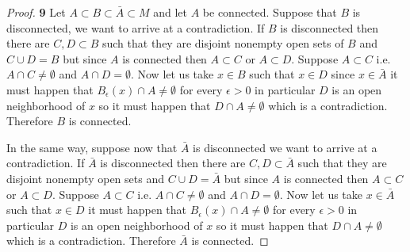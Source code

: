 \documentclass[11pt]{article}
\theoremstyle{definition}
\begin{document}
	\begin{proof}{\textbf{9}}
        Let $A \subset B \subset \bar{A} \subset M$ and let $A$ be connected.
        Suppose that $B$ is disconnected, we want to arrive at a contradiction.
        If $B$ is disconnected then there are $C,D \subset B$ such that they
        are disjoint nonempty open sets of $B$ and $C \cup D = B$ but since
        $A$ is connected then $A \subset C$ or $A \subset D$. Suppose
        $A \subset C$ i.e. $A \cap C \neq \emptyset$ and $A \cap D = \emptyset$.
        Now let us take
        $x \in B$ such that $x \in D$ since $x \in \bar{A}$ it must happen that
        $B_\epsilon(x) \cap A \neq \emptyset$ for every $\epsilon > 0$ in
        particular $D$ is an open neighborhood of $x$ so it must happen that
        $D \cap A \neq \emptyset$ which is a contradiction. Therefore $B$ is
        connected.

        In the same way, suppose now that $\bar{A}$ is disconnected we want to
        arrive at a contradiction. If $\bar{A}$ is disconnected then there are
        $C,D \subset \bar{A}$ such that they are disjoint nonempty open sets
        and $C \cup D = \bar{A}$ but since $A$ is connected then $A \subset C$
        or $A \subset D$. Suppose $A \subset C$ i.e. $A \cap C \neq \emptyset$
        and $A \cap D = \emptyset$.
        Now let us take $x \in \bar{A}$ such that $x \in D$ it must happen that
        $B_\epsilon(x) \cap A \neq \emptyset$ for every $\epsilon > 0$ in
        particular $D$ is an open neighborhood of $x$ so it must happen that
        $D \cap A \neq \emptyset$ which is a contradiction. Therefore $\bar{A}$
        is connected.
    \end{proof}
\cleardoublepage
\end{document}
